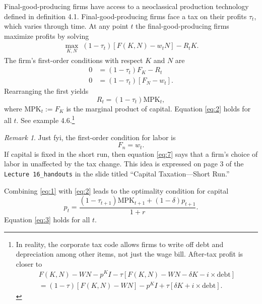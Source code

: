 \documentclass[12pt]{pracjourn_rwr}
\newcounter{ryan}
\theoremstyle{definition}
\theoremstyle{remark}
\newtheorem{remark}{Remark}[ryan]
\begin{document}
Final-good-producing firms have access to a neoclassical production technology defined in definition 4.1.
Final-good-producing firms face a tax on their profits $\tau_{t}$, which varies through time.
At any point $t$ the final-good-producing firms maximize profits by solving
\begin{align*}
\max_{K,N} \; (1-\tau_{t}) \left[ F(K,N) - w_{t}N \right] - R_{t}K .
\end{align*}
The firm's first-order conditions with respect $K$ and $N$ are
\begin{align*}
0 &= (1-\tau_{t})F_{K} - R_{t} \\
0 &= (1-\tau_{t})\left[ F_{N} - w_{t} \right].
\end{align*}
Rearranging the first yields
\begin{equation}
\label{eq:2}
R_{t} = (1-\tau_{t}) \text{MPK}_{t},
\end{equation}
where $\text{MPK}_{t} := F_{K}$ is the marginal product of capital.
Equation \eqref{eq:2} holds for all $t$.
See example 4.6.\footnote{In reality, the corporate tax code allows firms to write off debt and depreciation among other items,
  not just the wage bill.
  After-tax profit is closer to
  \begin{multline*}
  F(K,N) - WN - p^{K}I - \tau \left[ F(K,N) - WN - \delta K - i \times \text{debt} \right] \\
  = (1-\tau)\left[ F(K,N) - WN \right] - p^{K}I + \tau \left[ \delta K + i \times \text{debt} \right].
  \end{multline*}}

\begin{remark}
\label{remark:1}
Just fyi, the first-order condition for labor is
\begin{equation}
\label{eq:7}
F_{n} = w_{t}.
\end{equation}
If capital is fixed in the short run,
then equation \eqref{eq:7} says that a firm's choice of labor in unaffected by the tax change.
This idea is expressed on page 3 of the \texttt{Lecture 16\_handouts} in the slide titled
``Capital Taxation---Short Run.''
\end{remark}

Combining \eqref{eq:1} with \eqref{eq:2} leads to the optimality condition for capital
\begin{equation}
\label{eq:3}
p_{t} = \frac{(1-\tau_{t+1}) \text{MPK}_{t+1} + (1-\delta)p_{t+1}}{1+r}.
\end{equation}
Equation \eqref{eq:3} holds for all $t$.
\end{document}
